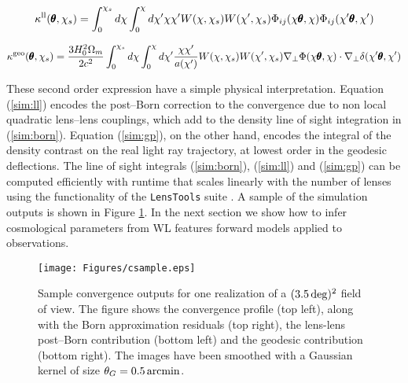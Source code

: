 \documentclass[reprint,aps,prd,superscriptaddress,showkeys,showpacs]{revtex4-1}
\newcommand{\ttt}[1]{\texttt{#1}}
\newcommand\pt{\pmb{\theta}}
\begin{document}
\begin{widetext}

\begin{equation}
\label{sim:ll}
\kappa^{\rm ll}(\pt,\chi_s) = \int_0^{\chi_s}d\chi\int_0^\chi d\chi' \chi\chi' W(\chi,\chi_s)W(\chi',\chi_s)\Phi_{ij}(\chi\pt,\chi)\Phi_{ij}(\chi'\pt,\chi')
\end{equation}

\begin{equation}
\label{sim:gp}
\kappa^{\rm geo}(\pt,\chi_s) = \frac{3H_0^2\Omega_m}{2c^2}\int_0^{\chi_s}d\chi\int_0^\chi d\chi' \frac{\chi\chi'}{a(\chi')} W(\chi,\chi_s)W(\chi',\chi_s)\nabla_\perp\Phi(\chi\pt,\chi)\cdot\nabla_\perp\delta(\chi'\pt,\chi')
\end{equation}

\end{widetext}
%
These second order expression have a simple physical interpretation. Equation (\ref{sim:ll}) encodes the post--Born correction to the convergence due to non local quadratic lens--lens couplings, which add to the density line of sight integration in (\ref{sim:born}). Equation (\ref{sim:gp}), on the other hand, encodes the integral of the density contrast on the real light ray trajectory, at lowest order in the geodesic deflections. The line of sight integrals (\ref{sim:born}), (\ref{sim:ll}) and (\ref{sim:gp}) can be computed efficiently with runtime that scales linearly with the number of lenses using the functionality of the \ttt{LensTools} suite \citep{LensTools-paper}. A sample of the simulation outputs is shown in Figure \ref{fig:csample}. In the next section we show how to infer cosmological parameters from WL features forward models applied to observations.  

\begin{figure*}
\begin{center}
\texttt{[image: Figures/csample.eps]}
\end{center}
\caption{Sample convergence outputs for one realization of a $(3.5\,{\rm deg})^2$ field of view. The figure shows the convergence profile (top left), along with the Born approximation residuals (top right), the lens-lens post--Born contribution (bottom left) and the geodesic contribution (bottom right). The images have been smoothed with a Gaussian kernel of size $\theta_G=0.5\,{\rm arcmin}$.}
\label{fig:csample}
\end{figure*} 

\end{document}
